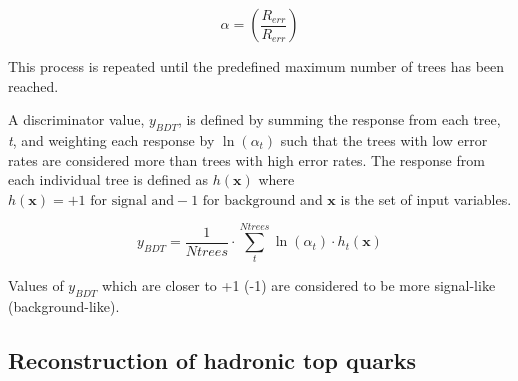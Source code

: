 \begin{equation}
\alpha = \left( \frac{R_{err}}{R_{err}}  \right)
\label{eqn:ErrorWeight}
\end{equation}

This process is repeated until the predefined maximum number of trees has been reached. 

A discriminator value, $y_{BDT}$, is defined by summing the response from each tree, \emph{t}, and weighting each response by $\ln \left(\alpha_{t}\right)$ such that the trees with low error rates are considered more than trees with high error rates. The response from each individual tree is defined as $h\left(\textbf{x}\right)$ where $h\left(\textbf{x}\right) = +1 \textrm{ for signal and} -1 \textrm{ for background}$ and $\textbf{x}$ is the set of input variables. 

\begin{equation}
y_{BDT} = \frac{1}{Ntrees} \cdot \sum_{t}^{Ntrees} \ln \left(\alpha_{t}\right) \cdot h_{t}\left(\textbf{x}\right)
\end{equation}

Values of $y_{BDT}$ which are closer to +1 (-1) are considered to be more signal-like (background-like).

\subsection{Reconstruction of hadronic top quarks \label{sec:topreco}}

